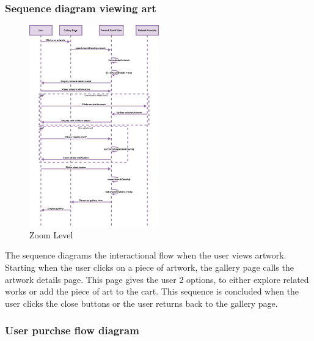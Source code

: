 \documentclass[]{project_final}
\begin{document}
\newpage
\subsubsection{Sequence diagram viewing art}

\begin{figure}[ht!]
    \centering
    \includegraphics[width=0.5\textwidth]{AGSequenceDiagramViewingArtWork.png}
    \vspace*{0.0cm}
    \caption{Zoom Level}
    \label{fig:1}
\end{figure}
The sequence diagrams the interactional flow when the user views artwork. Starting when the user clicks on a piece of artwork, the gallery page calls the artwork details page. This page gives the user 2 options, to either explore related works or add the piece of art to the cart.
This sequence is concluded when the user clicks the close buttons or the user returns back to the gallery page.
\newpage
\subsubsection{User purchse flow diagram}
\end{document}
